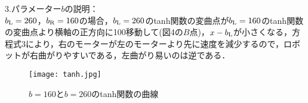 3.パラメーター$b$の説明：\\
$b_{\rm L}=260$，$b_{\rm R}=160$の場合，$b_{\rm L}=260$のtanh関数の変曲点が$b_{\rm L}=160$のtanh関数の変曲点より横軸の正方向に100移動して(図4の$B$点)，$x-b_{\rm L}$が小さくなる，方程式3により，右のモーターが左のモーターより先に速度を減少するので，ロボットが右曲がりやすいである，左曲がり易いのは逆である．
\begin{figure}[!ht]
    \centering
    \texttt{[image: tanh.jpg]}
    \caption{$b=160$と$b=260$のtanh関数の曲線}
\end{figure}

